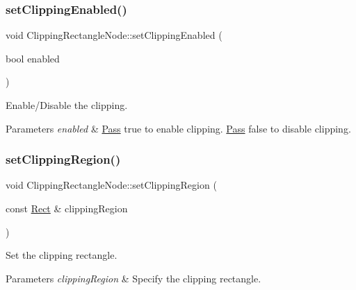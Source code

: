 \subsubsection{\texorpdfstring{set\+Clipping\+Enabled()}{setClippingEnabled()}\hspace{0.1cm}{\footnotesize\ttfamily [2/2]}}
{\footnotesize\ttfamily void Clipping\+Rectangle\+Node\+::set\+Clipping\+Enabled (\begin{DoxyParamCaption}\item[{bool}]{enabled }\end{DoxyParamCaption})\hspace{0.3cm}{\ttfamily [inline]}}



Enable/\+Disable the clipping. 


\begin{DoxyParams}{Parameters}
{\em enabled} & \hyperlink{classPass}{Pass} true to enable clipping. \hyperlink{classPass}{Pass} false to disable clipping. \\
\hline
\end{DoxyParams}
\mbox{\label{classClippingRectangleNode_a82398119a6db93a95eec2e8275119f2d}} 
\subsubsection{\texorpdfstring{set\+Clipping\+Region()}{setClippingRegion()}\hspace{0.1cm}{\footnotesize\ttfamily [1/2]}}
{\footnotesize\ttfamily void Clipping\+Rectangle\+Node\+::set\+Clipping\+Region (\begin{DoxyParamCaption}\item[{const \hyperlink{classRect}{Rect} \&}]{clipping\+Region }\end{DoxyParamCaption})}



Set the clipping rectangle. 


\begin{DoxyParams}{Parameters}
{\em clipping\+Region} & Specify the clipping rectangle. \\
\hline
\end{DoxyParams}
\mbox{\label{classClippingRectangleNode_a82398119a6db93a95eec2e8275119f2d}} 
